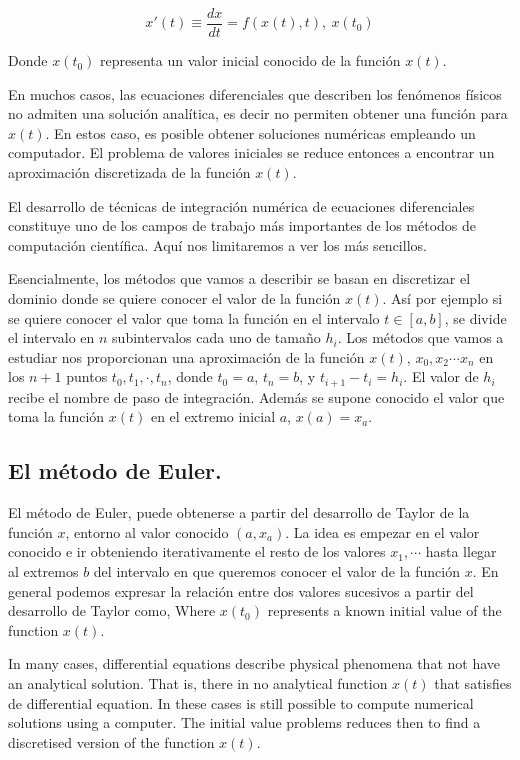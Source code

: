 \begin{equation*}
x'(t)\equiv \frac{dx}{dt}=f(x(t),t), \ x(t_0)
\end{equation*}
\begin{paracol}{2}
Donde $x(t_0)$ representa un valor inicial conocido de la función $x(t)$.

En muchos casos, las ecuaciones diferenciales que describen los fenómenos físicos no admiten una solución analítica, es decir no permiten obtener una función para $x(t)$. En estos caso, es posible obtener soluciones numéricas empleando un computador. El problema de valores iniciales se reduce entonces a encontrar un aproximación discretizada de la función $x(t)$. 

El desarrollo de técnicas de integración nu\-mérica de ecuaciones diferenciales constituye uno de los campos de trabajo más importantes de los métodos de computación científica. Aquí nos limitaremos a ver los más sencillos.

Esencialmente, los métodos que vamos a describir se basan en discretizar el dominio donde se quiere conocer el valor de la función $x(t)$. Así por ejemplo si se quiere conocer el valor que toma la función en el intervalo $t \in [a,b]$, se divide el intervalo en $n$ subintervalos cada uno de tamaño $h_i$. Los métodos que vamos a estudiar nos proporcionan una aproximación de la función $x(t)$, $x_0,x_2\cdots x_n$ en los $n+1$ puntos $t_0,t_1,\cdot, t_n$, donde $t_0=a$, $t_n=b$, y $t_{i+1}-t_i=h_i$. El valor de $h_i$ recibe el nombre de paso de integración. Además se supone conocido el valor que toma la función $x(t)$ en el extremo inicial $a$, $x(a)=x_a$.
  
\subsection{El método de Euler.}
El método de Euler, puede obtenerse a partir del desarrollo de Taylor de la función $x$, entorno al valor conocido $(a,x_a)$. La idea es empezar en el valor conocido e ir obteniendo iterativamente el resto de los valores $x_1,\cdots$ hasta llegar al extremos $b$ del intervalo en que queremos conocer el valor de la función $x$. En general podemos expresar la relación entre dos valores sucesivos a partir del desarrollo de Taylor como, 
\switchcolumn
Where $x(t_0)$ represents a known initial value of the function $x(t)$.

In many cases, differential equations describe physical phenomena that not have an analytical solution. That is, there in no analytical function $x(t)$ that satisfies de differential equation. In these cases is still possible to compute numerical solutions using a computer. The initial value problems reduces then to find  a discretised version of the function $x(t)$.


\end{paracol}
